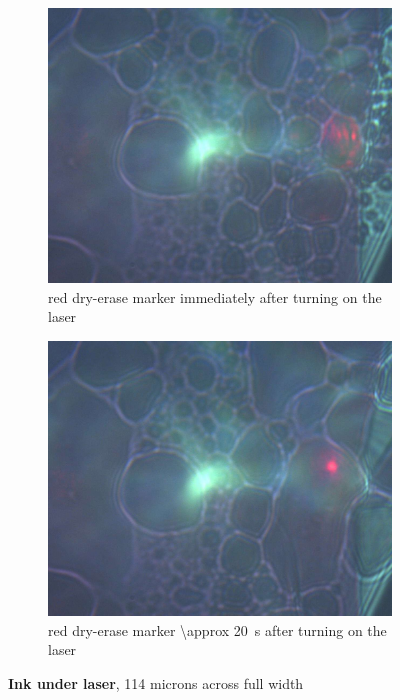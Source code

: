 \begin{figure}
  \begin{subfigure}{.45\textwidth}
    \centering
    \includegraphics[width=\textwidth]{./img/red-1.jpg}
    \caption{red dry-erase marker immediately after turning on the laser}
  \end{subfigure}
  \begin{subfigure}{.45\textwidth}
    \centering
    \includegraphics[width=\textwidth]{./img/red-2.jpg}
    \caption{red dry-erase marker \SI{\approx 20}{\s} after turning on the laser}
  \end{subfigure}

  \caption[Ink under laser]{\textbf{Ink under laser}, \num{114} microns across full width}
\end{figure}
